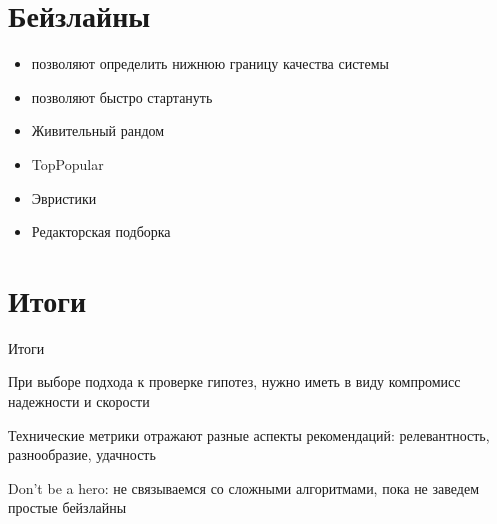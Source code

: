 \documentclass[11pt,aspectratio=169,handout]{beamer}
\begin{document}
\section{Бейзлайны}

\begin{frame}{}

\begin{tcolorbox}[colback=info!5,colframe=info!80,title=Простые бейзлайны]
\begin{itemize}
\item позволяют определить нижнюю границу качества системы
\item позволяют быстро стартануть
\end{itemize}

\end{tcolorbox}

\vfill

\begin{itemize}%
\item Живительный рандом
\item TopPopular
\item Эвристики
\item Редакторская подборка
\end{itemize}

\end{frame}

\section{Итоги}

\begin{frame}{Итоги}

\begin{tcolorbox}[colback=info!5,colframe=info!80,title=]
При выборе подхода к проверке гипотез, нужно иметь в виду компромисс надежности и скорости
\end{tcolorbox}

\begin{tcolorbox}[colback=info!5,colframe=info!80,title=]
Технические метрики отражают разные аспекты рекомендаций: релевантность, разнообразие, удачность
\end{tcolorbox}

\begin{tcolorbox}[colback=info!5,colframe=info!80,title=]
Don't be a hero: не связываемся со сложными алгоритмами, пока не заведем простые бейзлайны
\end{tcolorbox}

\end{frame}
\end{document}

